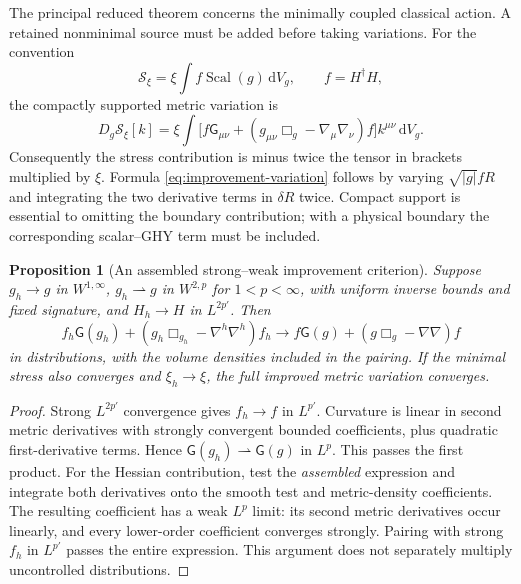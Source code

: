 \documentclass[11pt]{article}
\numberwithin{equation}{section}
\newtheorem{proposition}[proposition]{Proposition}
\theoremstyle{definition}
\theoremstyle{remark}
\newcommand{\dd}{\mathrm d}
\newcommand{\Scal}{\operatorname{Scal}}
\newcommand{\Sact}{\mathscr S}
\newcommand{\Eins}{\mathsf G}
\newcommand{\dV}{\dd V}
\begin{document}
The principal reduced theorem concerns the minimally coupled classical action. A retained nonminimal source must be added before taking variations. For the convention
\begin{equation}
 \Sact_\xi=\xi\int f\Scal(g)\,\dV_g,
 \qquad f=H^\dagger H,
 \label{eq:xi-action}
\end{equation}
the compactly supported metric variation is
\begin{equation}
 D_g\Sact_\xi[k]
 =\xi\int\bigl[f\Eins_{\mu\nu}
       +(g_{\mu\nu}\Box_g-\nabla_\mu\nabla_\nu)f\bigr]
       k^{\mu\nu}\,\dV_g.
 \label{eq:improvement-variation}
\end{equation}
Consequently the stress contribution is minus twice the tensor in brackets multiplied by $\xi$. Formula \eqref{eq:improvement-variation} follows by varying $\sqrt{|g|}fR$ and integrating the two derivative terms in $\delta R$ twice. Compact support is essential to omitting the boundary contribution; with a physical boundary the corresponding scalar--GHY term must be included.

\begin{proposition}[An assembled strong--weak improvement criterion]
\label{prop:improvement}
Suppose $g_h\to g$ in $W^{1,\infty}$, $g_h\rightharpoonup g$ in $W^{2,p}$ for $1<p<\infty$, with uniform inverse bounds and fixed signature, and $H_h\to H$ in $L^{2p'}$. Then
\begin{equation}
 f_h\Eins(g_h)+(g_h\Box_{g_h}-\nabla^{h}\nabla^{h})f_h
 \longrightarrow
 f\Eins(g)+(g\Box_g-\nabla\nabla)f
 \label{eq:improvement-limit}
\end{equation}
in distributions, with the volume densities included in the pairing. If the minimal stress also converges and $\xi_h\to\xi$, the full improved metric variation converges.
\end{proposition}
\begin{proof}
Strong $L^{2p'}$ convergence gives $f_h\to f$ in $L^{p'}$. Curvature is linear in second metric derivatives with strongly convergent bounded coefficients, plus quadratic first-derivative terms. Hence $\Eins(g_h)\rightharpoonup\Eins(g)$ in $L^p$. This passes the first product. For the Hessian contribution, test the \emph{assembled} expression and integrate both derivatives onto the smooth test and metric-density coefficients. The resulting coefficient has a weak $L^p$ limit: its second metric derivatives occur linearly, and every lower-order coefficient converges strongly. Pairing with strong $f_h$ in $L^{p'}$ passes the entire expression. This argument does not separately multiply uncontrolled distributions.
\end{proof}
\end{document}
